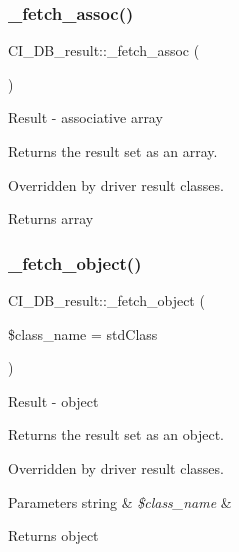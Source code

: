 \subsubsection{\texorpdfstring{\+\_\+fetch\+\_\+assoc()}{\_fetch\_assoc()}}
{\footnotesize\ttfamily C\+I\+\_\+\+D\+B\+\_\+result\+::\+\_\+fetch\+\_\+assoc (\begin{DoxyParamCaption}{ }\end{DoxyParamCaption})\hspace{0.3cm}{\ttfamily [protected]}}

Result -\/ associative array

Returns the result set as an array.

Overridden by driver result classes.

\begin{DoxyReturn}{Returns}
array 
\end{DoxyReturn}
\mbox{\label{class_c_i___d_b__result_a5acbf9e2350f9a8a846d2ea933da3e21}} 
\subsubsection{\texorpdfstring{\+\_\+fetch\+\_\+object()}{\_fetch\_object()}}
{\footnotesize\ttfamily C\+I\+\_\+\+D\+B\+\_\+result\+::\+\_\+fetch\+\_\+object (\begin{DoxyParamCaption}\item[{}]{\$class\+\_\+name = {\ttfamily \textquotesingle{}stdClass\textquotesingle{}} }\end{DoxyParamCaption})\hspace{0.3cm}{\ttfamily [protected]}}

Result -\/ object

Returns the result set as an object.

Overridden by driver result classes.


\begin{DoxyParams}[1]{Parameters}
string & {\em \$class\+\_\+name} & \\
\hline
\end{DoxyParams}
\begin{DoxyReturn}{Returns}
object 
\end{DoxyReturn}
\mbox{\label{class_c_i___d_b__result_afe0af27f3ea920d51d39b471230bba53}} 
